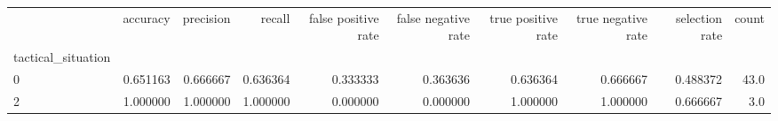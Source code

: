 \begin{tabular}{lrrrrrrrrr}
\toprule
{} &  accuracy &  precision &    recall &  false positive rate &  false negative rate &  true positive rate &  true negative rate &  selection rate &  count \\
tactical\_situation &           &            &           &                      &                      &                     &                     &                 &        \\
\midrule
0                  &  0.651163 &   0.666667 &  0.636364 &             0.333333 &             0.363636 &            0.636364 &            0.666667 &        0.488372 &   43.0 \\
2                  &  1.000000 &   1.000000 &  1.000000 &             0.000000 &             0.000000 &            1.000000 &            1.000000 &        0.666667 &    3.0 \\
\bottomrule
\end{tabular}
